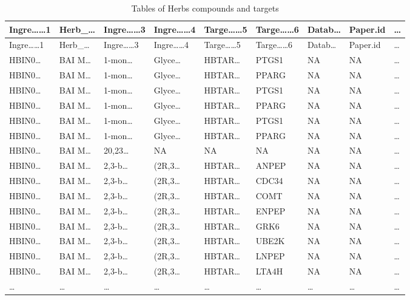 \documentclass[
]{article}
\begin{document}
\begin{longtable}[]{@{}lllllllll@{}}
\caption{\label{tab:tables-of-Herbs-compounds-and-targets}Tables of Herbs compounds and targets}\tabularnewline
\toprule
Ingre\ldots\ldots1 & Herb\_\ldots{} & Ingre\ldots\ldots3 & Ingre\ldots\ldots4 & Targe\ldots\ldots5 & Targe\ldots\ldots6 & Datab\ldots{} & Paper.id & \ldots{}\tabularnewline
\midrule
\endfirsthead
\toprule
Ingre\ldots\ldots1 & Herb\_\ldots{} & Ingre\ldots\ldots3 & Ingre\ldots\ldots4 & Targe\ldots\ldots5 & Targe\ldots\ldots6 & Datab\ldots{} & Paper.id & \ldots{}\tabularnewline
\midrule
\endhead
HBIN0\ldots{} & BAI M\ldots{} & 1-mon\ldots{} & Glyce\ldots{} & HBTAR\ldots{} & PTGS1 & NA & NA & \ldots{}\tabularnewline
HBIN0\ldots{} & BAI M\ldots{} & 1-mon\ldots{} & Glyce\ldots{} & HBTAR\ldots{} & PPARG & NA & NA & \ldots{}\tabularnewline
HBIN0\ldots{} & BAI M\ldots{} & 1-mon\ldots{} & Glyce\ldots{} & HBTAR\ldots{} & PTGS1 & NA & NA & \ldots{}\tabularnewline
HBIN0\ldots{} & BAI M\ldots{} & 1-mon\ldots{} & Glyce\ldots{} & HBTAR\ldots{} & PPARG & NA & NA & \ldots{}\tabularnewline
HBIN0\ldots{} & BAI M\ldots{} & 1-mon\ldots{} & Glyce\ldots{} & HBTAR\ldots{} & PTGS1 & NA & NA & \ldots{}\tabularnewline
HBIN0\ldots{} & BAI M\ldots{} & 1-mon\ldots{} & Glyce\ldots{} & HBTAR\ldots{} & PPARG & NA & NA & \ldots{}\tabularnewline
HBIN0\ldots{} & BAI M\ldots{} & 20,23\ldots{} & NA & NA & NA & NA & NA & \ldots{}\tabularnewline
HBIN0\ldots{} & BAI M\ldots{} & 2,3-b\ldots{} & (2R,3\ldots{} & HBTAR\ldots{} & ANPEP & NA & NA & \ldots{}\tabularnewline
HBIN0\ldots{} & BAI M\ldots{} & 2,3-b\ldots{} & (2R,3\ldots{} & HBTAR\ldots{} & CDC34 & NA & NA & \ldots{}\tabularnewline
HBIN0\ldots{} & BAI M\ldots{} & 2,3-b\ldots{} & (2R,3\ldots{} & HBTAR\ldots{} & COMT & NA & NA & \ldots{}\tabularnewline
HBIN0\ldots{} & BAI M\ldots{} & 2,3-b\ldots{} & (2R,3\ldots{} & HBTAR\ldots{} & ENPEP & NA & NA & \ldots{}\tabularnewline
HBIN0\ldots{} & BAI M\ldots{} & 2,3-b\ldots{} & (2R,3\ldots{} & HBTAR\ldots{} & GRK6 & NA & NA & \ldots{}\tabularnewline
HBIN0\ldots{} & BAI M\ldots{} & 2,3-b\ldots{} & (2R,3\ldots{} & HBTAR\ldots{} & UBE2K & NA & NA & \ldots{}\tabularnewline
HBIN0\ldots{} & BAI M\ldots{} & 2,3-b\ldots{} & (2R,3\ldots{} & HBTAR\ldots{} & LNPEP & NA & NA & \ldots{}\tabularnewline
HBIN0\ldots{} & BAI M\ldots{} & 2,3-b\ldots{} & (2R,3\ldots{} & HBTAR\ldots{} & LTA4H & NA & NA & \ldots{}\tabularnewline
\ldots{} & \ldots{} & \ldots{} & \ldots{} & \ldots{} & \ldots{} & \ldots{} & \ldots{} & \ldots{}\tabularnewline
\bottomrule
\end{longtable}
\end{document}
